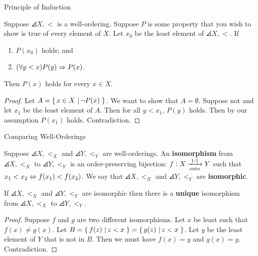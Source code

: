 \documentclass[pdf,final]{prosper}
\newcommand{\skipsmall}{\vspace{1em}}
\begin{document}
\begin{slide}{Principle of Induction}
\begin{lemma}
Suppose $\angles{X,<}$ is a well-ordering. Suppose $P$ is some property that you
wish to show is true of every element of $X$. Let $x_0$ be the least element of
$\angles{X,<}$. If
\begin{enumerate}
  \item $P(x_0)$ holds; and
  \item $(\forall y<x)P(y)\Rightarrow P(x)$.
\end{enumerate}
Then $P(x)$ holds for every $x\in X$.
\end{lemma}
\begin{proof}
Let $A=\left\{ \, x\in X \, \left| \, \neg P(x) \, \right.\right\}$. We want to show that $A=\emptyset$. Suppose
not and let $x_1$ be the least element of $A$. Then for all $y<x_1$, $P(y)$
holds. Then by our assumption $P(x_1)$ holds. Contradiction.
\end{proof}
\end{slide}

\begin{slide}{Comparing Well-Orderings}

\begin{definition}
Suppose  $\angles{X,<_X}$ and $\angles{Y,<_Y}$ are well-orderings. An
\textbf{isomorphism} from $\angles{X,<_X}$ to $\angles{Y,<_Y}$ is
an order-preserving bijection: $f:X\xrightarrow[\text{onto}]{\text{1-1}} Y$ such that $x_1<x_2 \Leftrightarrow
f(x_1)<f(x_2)$. We say that $\angles{X,<_X}$ and $\angles{Y,<_Y}$ are \textbf{isomorphic}.
\end{definition}

\skipsmall

\begin{lemma}
If $\angles{X,<_X}$ and $\angles{Y,<_Y}$ are isomorphic then there is a
\textbf{unique} isomorphism from $\angles{X,<_X}$ to $\angles{Y,<_Y}$.
\end{lemma}
\begin{proof}
Suppose $f$ and $g$	are two different isomorphisms. Let $x$ be least such that
$f(x)\not=g(x)$. Let $B=\left\{ \, f(z) \, \left| \, z<x \, \right.\right\}=\left\{ \, g(z) \, \left| \, z<x \, \right.\right\}$. Let $y$ be the
least element of $Y$ that is not in $B$. Then we must have $f(x)=y$ and
$g(x)=y$. Contradiction.
\end{proof}

\end{slide}
\end{document}
